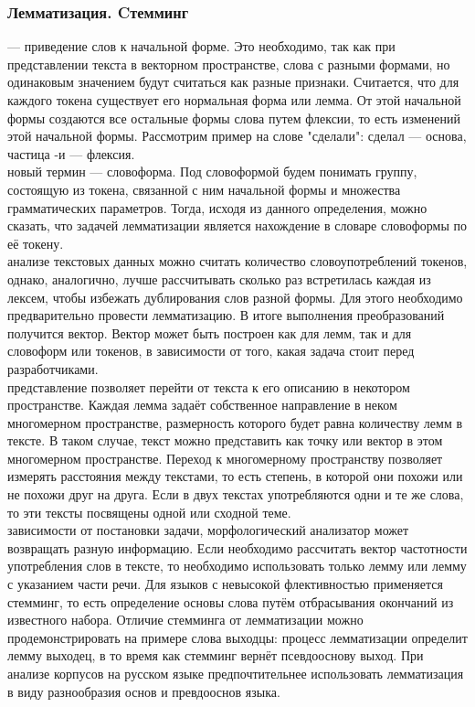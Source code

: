 \documentclass{article}
\newcommand\tab[1][1cm]{\hspace*{#1}}
\begin{document}
\subsubsection{Лемматизация. Cтемминг}
 — приведение слов к начальной форме. Это необходимо, так как при представлении текста в векторном пространстве, слова с разными формами, но одинаковым значением будут считаться как разные признаки. Считается, что для каждого токена существует его нормальная форма или лемма. От этой начальной формы создаются все остальные формы слова путем флексии, то есть изменений этой начальной формы. Рассмотрим пример на слове "сделали": сделал — основа, частица -и — флексия.\\
 новый термин — словоформа. Под словоформой будем понимать группу, состоящую из токена, связанной с ним начальной формы и множества грамматических параметров. Тогда, исходя из данного определения, можно сказать, что задачей лемматизации является нахождение в словаре словоформы по её токену.\\
 анализе текстовых данных можно считать количество словоупотреблений токенов, однако, аналогично, лучше рассчитывать сколько раз встретилась каждая из лексем, чтобы избежать дублирования слов разной формы. Для этого необходимо предварительно провести лемматизацию. В итоге выполнения преобразований получится вектор. Вектор может быть построен как для лемм, так и для словоформ или токенов, в зависимости от того, какая задача стоит перед разработчиками.\\
 представление позволяет перейти от текста к его описанию в некотором пространстве. Каждая лемма задаёт собственное направление в неком многомерном пространстве, размерность которого будет равна количеству лемм в тексте. В таком случае, текст можно представить как точку или вектор в этом многомерном пространстве. Переход к многомерному пространству позволяет измерять расстояния между текстами, то есть степень, в которой они похожи или не похожи друг на друга. Если в двух текстах употребляются одни и те же слова, то эти тексты посвящены одной или сходной теме.\\
 зависимости от постановки задачи, морфологический анализатор может возвращать разную информацию. Если необходимо рассчитать вектор частотности употребления слов в тексте, то необходимо использовать только лемму или лемму с указанием части речи. Для языков с невысокой флективностью применяется стемминг, то есть определение основы слова путём отбрасывания окончаний из известного набора. Отличие стемминга от лемматизации можно продемонстрировать на примере слова выходцы: процесс лемматизации определит лемму выходец, в то время как стемминг вернёт псевдооснову выход. При анализе корпусов на русском языке предпочтительнее использовать лемматизация в виду разнообразия основ и превдооснов языка.
\end{document}
